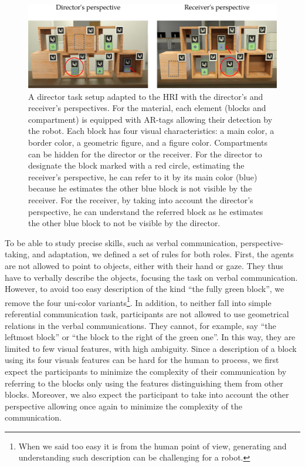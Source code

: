 \begin{figure}[ht!]
\centering
\includegraphics[width=\textwidth]{figures/chapter9/setup.png}
\caption{\label{fig:chap9_setup} A director task setup adapted to the HRI with the director's and receiver's perspectives. For the material, each element (blocks and compartment) is equipped with AR-tags allowing their detection by the robot. Each block has four visual characteristics: a main color, a border color, a geometric figure, and a figure color. Compartments can be hidden for the director or the receiver. For the director to designate the block marked with a red circle, estimating the receiver's perspective, he can refer to it by its main color (blue) because he estimates the other blue block is not visible by the receiver. For the receiver, by taking into account the director's perspective, he can understand the referred block as he estimates the other blue block to not be visible by the director.}
\end{figure}

To be able to study precise skills, such as verbal communication, perspective-taking, and adaptation, we defined a set of rules for both roles. First, the agents are not allowed to point to objects, either with their hand or gaze. They thus have to verbally describe the objects, focusing the task on verbal communication. However, to avoid too easy description of the kind ``the fully green block'', we remove the four uni-color variants\footnote{When we said too easy it is from the human point of view, generating and understanding such description can be challenging for a robot.}. In addition, to neither fall into simple referential communication task, participants are not allowed to use geometrical relations in the verbal communications. They cannot, for example, say ``the leftmost block'' or ``the block to the right of the green one''. In this way, they are limited to few visual features, with high ambiguity. Since a description of a block using its four visuals features can be hard for the human to process, we first expect the participants to minimize the complexity of their communication by referring to the blocks only using the features distinguishing them from other blocks. Moreover, we also expect the participant to take into account the other perspective allowing once again to minimize the complexity of the communication.

